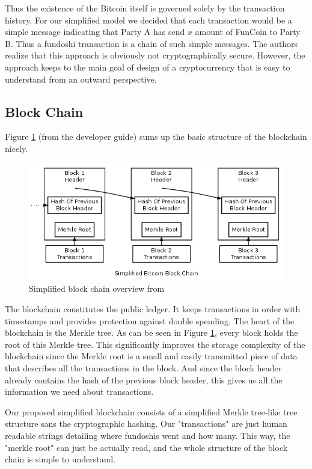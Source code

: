 \documentclass[12pt]{article}
\begin{document}
Thus the existence of the Bitcoin itself is governed solely by the transaction history. For our
simplified model we decided that each transaction would be a simple message indicating that Party
A has send $x$ amount of FunCoin to Party B. Thus a fundoshi transaction is a chain of such simple
messages. The authors realize that this approach is obviously not cryptographically secure. However,
the approach keeps to the main goal of design of a cryptocurrency that is easy to understand from an
outward perspective.

\subsection{Block Chain}\label{blockchain}
Figure \ref{figblockchain} (from the developer guide) sums up the basic structure of the blockchain nicely. 

\begin{figure}[h!]\label{figblockchain}
	\centering
	\includegraphics[scale=0.5]{en-blockchain-overview.png}
	\caption{Simplified block chain overview from \cite{dev:guide}}
\end{figure}

The blockchain constitutes the public ledger. It keeps transactions in order with timestamps and provides protection
against double spending. The heart of the blockchain is the Merkle tree. As can be seen in Figure \ref{figblockchain},
every block holds the root of this Merkle tree. This significantly improves the storage complexity of the blockchain since
the Merkle root is a small and easily transmitted piece of data that describes all the transactions in the block. And since
the block header already contains the hash of the previous block header, this gives us all the information we need about transactions. 

Our proposed simplified blockchain consists of a simplified Merkle tree-like tree structure sans the cryptographic hashing. Our
"transactions" are just human readable strings detailing where fundoshis went and how many.
This way, the "merkle root" can just be actually read, and the whole structure of the block chain is simple to understand.
\end{document}
